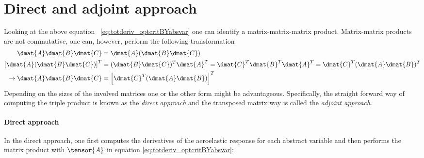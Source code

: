 \documentclass[../main.tex]{subfiles}
\begin{document}
\section{Direct and adjoint approach}
Looking at the above equation ~\ref{eq:totderiv_optcritBYabsvar} one can identify a matrix-matrix-matrix product. Matrix-matrix products are not commutative, one can, however, perform the following transformation
\begin{align}\label{eq:adjoint_concept}
\dmat{A}\dmat{B}\dmat{C}                    &= \dmat{A}(\dmat{B}\dmat{C}) \nonumber\\
\left[ \dmat{A}(\dmat{B}\dmat{C}) \right]^T &= (\dmat{B}\dmat{C})^T\dmat{A}^T=\dmat{C}^T\dmat{B}^T\dmat{A}^T=\dmat{C}^T(\dmat{A}\dmat{B})^T \nonumber\\
\rightarrow \dmat{A}\dmat{B}\dmat{C}        &= \left[\dmat{C}^T(\dmat{A}\dmat{B})\right]^T
\end{align}
Depending on the sizes of the involved matrices one or the other form might be advantageous. Specifically, the straight forward way of computing the triple product is known as the \textit{direct approach} and the transposed matrix way is called the \textit{adjoint approach}.

\paragraph{Direct approach}
In the direct approach, one first computes the derivatives of the aeroelastic response for each abstract variable and then performs the matrix product with $\tensor{A}$ in equation \eqref{eq:totderiv_optcritBYabsvar}:
\end{document}
